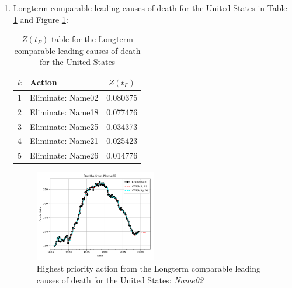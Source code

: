 \documentclass[12pt, a4paper, twocolumn]{article}
\begin{document}
\begin{enumerate}
  \item Longterm comparable leading causes of death for the United States\cite{uslcod19001998,nbermortality,centers2017underlying,uspopulation19002001,censusestimates19001999} in Table \ref{table:ztable4} and Figure \ref{fig:k4}:
    \begin{table}[H]
      \centering
      \begin{tabular}{clc}
        \toprule
          $k$ & Action            & $Z(t_F)$ \\
        \midrule
          1   & Eliminate: Name02 & 0.080375 \\
          2   & Eliminate: Name18 & 0.077476 \\
          3   & Eliminate: Name25 & 0.034373 \\
          4   & Eliminate: Name21 & 0.025423 \\
          5   & Eliminate: Name26 & 0.014776 \\
        \bottomrule
      \end{tabular}
      \caption{$Z(t_F)$ table for the Longterm comparable leading causes of death for the United States}
      \label{table:ztable4}
    \end{table}
    \begin{figure}[H]
      \centering
      \includegraphics[width=0.5\textwidth]{results/US_ICD_LONGTERM_COMPARABLE_LEADING/Name02_ets.png}
      \caption{Highest priority action from the Longterm comparable leading causes of death for the United States: \textit{Name02}}\label{fig:k4}
    \end{figure}
  

\end{enumerate}
\end{document}
